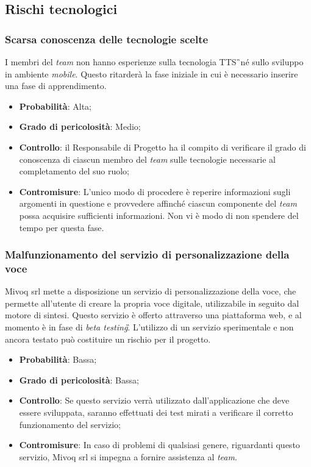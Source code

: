 \subsection{Rischi tecnologici}

\subsubsection{Scarsa conoscenza delle tecnologie scelte}
\label{sec:ScarsTec}
I membri del \textit{team} non hanno esperienze sulla tecnologia TTS\G\ né sullo sviluppo in ambiente \textit{mobile}. Questo ritarderà la fase iniziale in cui è necessario inserire una fase di apprendimento.
\begin{itemize}
\item \textbf{Probabilità}: Alta;
\item \textbf{Grado di pericolosità}: Medio;
\item \textbf{Controllo}: il Responsabile di Progetto ha il compito di verificare il grado di conoscenza di ciascun membro del \textit{team} sulle tecnologie necessarie al completamento del suo ruolo;
\item \textbf{Contromisure}: L'unico modo di procedere è reperire informazioni sugli argomenti in questione e provvedere affinché ciascun componente del \textit{team} possa acquisire sufficienti informazioni. Non vi è modo di non spendere del tempo per questa fase.
\end{itemize}

\subsubsection{Malfunzionamento del servizio di personalizzazione della voce}
\label{sec:PMalf}
Mivoq srl mette a disposizione un servizio di personalizzazione della voce, che permette all'utente di creare la propria voce digitale, utilizzabile in seguito dal motore di sintesi. Questo servizio è offerto attraverso una piattaforma web, e al momento è in fase di \textit{beta testing}\G. L'utilizzo di un servizio sperimentale e non ancora testato può costituire un rischio per il progetto.
\begin{itemize}
\item \textbf{Probabilità}: Bassa;
\item \textbf{Grado di pericolosità}: Bassa;
\item \textbf{Controllo}: Se questo servizio verrà utilizzato dall'applicazione che deve essere sviluppata, saranno effettuati dei test mirati a verificare il corretto funzionamento del servizio;
\item \textbf{Contromisure}: In caso di problemi di qualsiasi genere, riguardanti questo servizio, Mivoq srl si impegna a fornire assistenza al \textit{team}. 
\end{itemize} 

